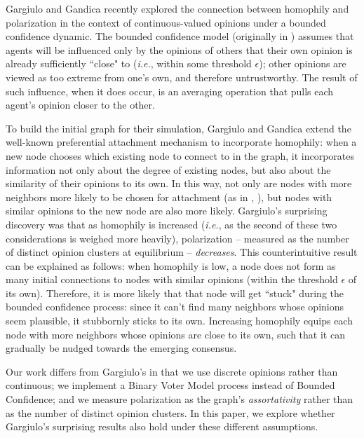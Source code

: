 
Gargiulo and Gandica\cite{gargiulo_role_2017} recently explored the connection
between homophily and polarization in the context of continuous-valued
opinions under a bounded confidence dynamic. The bounded confidence model
(originally in \cite{deffuant_mixing_2000,hegselmann_opinion_2002}) assumes
that agents will be influenced only by the opinions of others that their own
opinion is already sufficiently ``close" to (\textit{i.e.}, within some
threshold $\epsilon$); other opinions are viewed as too extreme from one's
own, and therefore untrustworthy. The result of such influence, when it does
occur, is an averaging operation that pulls each agent's opinion closer to the
other.

To build the initial graph for their simulation, Gargiulo and Gandica extend
the well-known preferential attachment mechanism
\cite{barabasi_emergence_1999} to incorporate homophily: when a new node
chooses which existing node to connect to in the graph, it incorporates
information not only about the degree of existing nodes, but also about the
similarity of their opinions to its own. In this way, not only are nodes with
more neighbors more likely to be chosen for attachment (as in
\cite{barabasi_emergence_1999}, \cite{deffuant_mixing_2000}), but nodes with
similar opinions to the new node are also more likely. Gargiulo's surprising
discovery was that as homophily is increased (\textit{i.e.}, as the second of
these two considerations is weighed more heavily), polarization -- measured as
the number of distinct opinion clusters at equilibrium -- \textit{decreases}.
This counterintuitive result can be explained as follows: when homophily is
low, a node does not form as many initial connections to nodes with similar
opinions (within the threshold $\epsilon$ of its own). Therefore, it is more
likely that that node will get ``stuck" during the bounded confidence process:
since it can't find many neighbors whose opinions seem plausible, it
stubbornly sticks to its own. Increasing homophily equips each node with more
neighbors whose opinions are close to its own, such that it can gradually be
nudged towards the emerging consensus.

Our work differs from Gargiulo's in that we use discrete opinions rather than
continuous; we implement a Binary Voter Model
process\cite{clifford_model_1973,holley_ergodic_1975} instead of Bounded
Confidence; and we measure polarization as the graph's \textit{assortativity}
rather than as the number of distinct opinion clusters. In this paper, we
explore whether Gargiulo's surprising results also hold under these different
assumptions.

